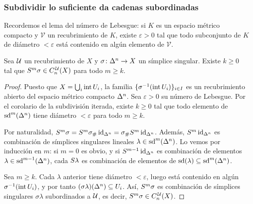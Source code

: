 \begin{frame}[allowframebreaks]
  \frametitle{Subdividir lo suficiente da cadenas subordinadas}

  Recordemos el lema del número de Lebesgue: si $K$ es un espacio métrico
  compacto y $\mathcal{V}$ un recubrimiento de $K$, existe
  $\varepsilon>0$ tal que todo subconjunto de $K$ de diámetro
  $<\varepsilon$ está contenido en algún elemento de $\mathcal{V}$.

  \begin{proposition}
    Sea $\mathcal{U}$ un recubrimiento de $X$ y $\sigma\colon\Delta^{n}\to X$ un
    símplice singular. Existe $k\geq0$ tal que $S^m\sigma\in C^{\mkern2mu\mathcal{U}}_n(X)$
    para todo $m\geq k$.
  \end{proposition}

  \framebreak

  \begin{proof}
    Puesto que $X=\bigcup_i\operatorname{int} U_i$, la familia
    $\{\sigma^{-1}(\operatorname{int} U_i)\}_{i\in I}$ es un recubrimiento abierto del
    espacio métrico compacto $\Delta^{n}$. Sea $\varepsilon>0$ su número de
    Lebesgue. Por el corolario de la subdivisión iterada, existe $k\geq0$ tal
    que todo elemento de $\operatorname{sd}^m(\Delta^{n})$ tiene diámetro $<\varepsilon$
    para todo $m\geq k$.

    \medskip

    Por naturalidad,
    $S^m\sigma=S^m\sigma_\#\operatorname{id}_{\Delta^{n}}=\sigma_\#S^m\operatorname{id}_{\Delta^{n}}$.
    Además, $S^m\operatorname{id}_{\Delta^{n}}$ es combinación de símplices singulares
    lineales $\lambda\in\operatorname{sd}^m(\Delta^{n})$. Lo vemos por inducción en $m$:
    si $m=0$ es obvio, y si $S^{m-1}\operatorname{id}_{\Delta^{n}}$ es combinación de
    elementos $\lambda\in\operatorname{sd}^{m-1}(\Delta^{n})$, cada $S\lambda$ es
    combinación de elementos de $\operatorname{sd}(\lambda)\subseteq\operatorname{sd}^m(\Delta^{n})$.

    \medskip

    Sea $m\geq k$. Cada $\lambda$ anterior tiene diámetro $<\varepsilon$,
    luego está contenido en algún $\sigma^{-1}(\operatorname{int} U_i)$, y por tanto
    $(\sigma\lambda)(\Delta^{n})\subseteq U_i$. Así, $S^m\sigma$ es
    combinación de símplices singulares $\sigma\lambda$ subordinados a
    $\mathcal{U}$, es decir, $S^m\sigma\in C^{\mkern2mu\mathcal{U}}_n(X)$.
  \end{proof}
\end{frame}

